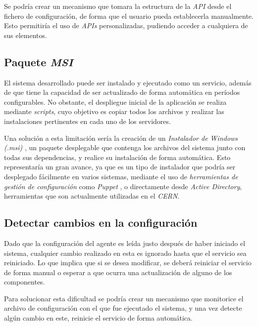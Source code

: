         Se podría crear un mecanismo que tomara la estructura de la \textit{API} desde el fichero de configuración, de forma que el usuario pueda establecerla manualmente. Esto permitiría el uso de \textit{APIs} personalizadas, pudiendo acceder a cualquiera de sus elementos.

    \subsection{Paquete \textit{MSI}}
        El sistema desarrollado puede ser instalado y ejecutado como un servicio, además de que tiene la capacidad de ser actualizado de forma automática en períodos configurables. No obstante, el despliegue inicial de la aplicación se realiza mediante \textit{scripts}, cuyo objetivo es copiar todos los archivos y realizar las instalaciones pertinentes en cada uno de los servidores.
        
        Una solución a esta limitación sería la creación de un \textit{Instalador de Windows (.msi)} \cite{msi}, un paquete desplegable que contenga los archivos del sistema junto con todas sus dependencias, y realice su instalación de forma automática. Esto representaría un gran avance, ya que es un tipo de instalador que podría ser desplegado fácilmente en varios sistemas, mediante el uso de \textit{herramientas de gestión de configuración} \cite{configmanag} como \textit{Puppet} \cite{puppet}, o directamente desde \textit{Active Directory}, herramientas que son actualmente utilizadas en el \textit{CERN}.

    \subsection{Detectar cambios en la configuración}
        Dado que la configuración del agente es leída justo después de haber iniciado el sistema, cualquier cambio realizado en esta es ignorado hasta que el servicio sea reiniciado. Lo que implica que si se desea modificar, se deberá reiniciar el servicio de forma manual o esperar a que ocurra una actualización de alguno de los componentes.
        
        Para solucionar esta dificultad se podría crear un mecanismo que monitorice el archivo de configuración con el que fue ejecutado el sistema, y una vez detecte algún cambio en este, reinicie el servicio de forma automática.

